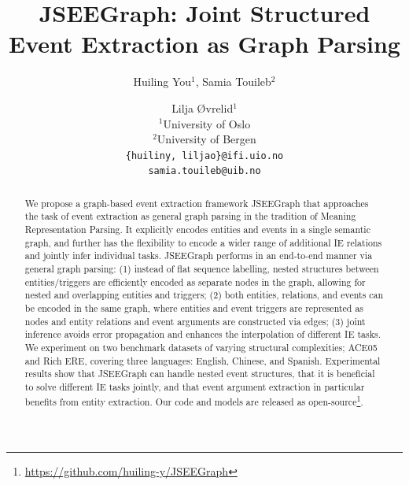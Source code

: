 \documentclass[11pt]{article}
\title{JSEEGraph: Joint Structured Event Extraction as Graph Parsing}
\author{Huiling You$^1$, Samia Touileb$^2$ \and Lilja Øvrelid$^1$ \\
         $^1$University of Oslo\\
         $^2$University of Bergen \\ 
         \texttt{\{huiliny, liljao\}@ifi.uio.no} \\
         \texttt{samia.touileb@uib.no}
}
\begin{document}
\maketitle
\begin{abstract}
We propose a graph-based event extraction framework JSEEGraph that approaches the task of event extraction as general graph parsing in the tradition of Meaning Representation Parsing. It explicitly encodes entities and events in a single semantic graph, and further has the flexibility to encode a wider range of additional IE relations and jointly infer individual tasks. JSEEGraph performs in an end-to-end manner via general graph parsing: (1) instead of flat sequence labelling, nested structures between entities/triggers are efficiently encoded as separate nodes in the graph, allowing for nested and overlapping entities and triggers; (2) both entities, relations, and events can be encoded in the same graph, where entities and event triggers are represented as nodes and entity relations and event arguments are constructed via edges;  (3) joint inference avoids error propagation and enhances the interpolation of different IE tasks. We experiment on two benchmark datasets of varying structural complexities; ACE05 and Rich ERE, covering three languages: English, Chinese, and Spanish. Experimental results show that JSEEGraph can handle nested event structures, that it is beneficial to solve different IE tasks jointly, and that event argument extraction in particular benefits from entity extraction. Our code and models are released as open-source\footnote{\url{https://github.com/huiling-y/JSEEGraph}}.
\end{abstract}
\end{document}

